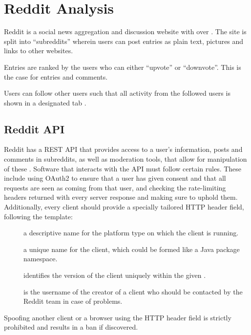 \section{Reddit Analysis}\label{sec:reddit-analysis}
Reddit is a social news aggregation and discussion website with over 
\citep{AdvertiseOnReddit}.
The site is split into ``subreddits'' wherein users can post entries as plain text, pictures and links to other websites. \nl

Entries are ranked by the users who can either ``upvote'' or ``downvote''. This
is the case for entries and comments. \citep{AboutReddit}\nl

Users can follow other users such that all activity from the followed users is
shown in a designated tab .

\subsection{Reddit API}\label{subsec:reddit-api}

Reddit has a \ac{REST} \ac{API} that provides access to a user's information,
posts and comments in subreddits, as well as moderation tools, that allow for
manipulation of these \citep{RedditApi}. Software that interacts with the
\ac{API} must follow certain rules. These include using OAuth2 to ensure that a
user has given consent and that all requests are seen as coming from that user,
and checking the rate-limiting headers returned with every server response and
making sure to uphold them.
Additionally, every client should provide a specially tailored 
\ac{HTTP} header field, following the template: \citep{RedditApiRules}\nl

\begin{center}
\end{center}\nl
\begin{description}
  \item[] a descriptive name for the platform type on which the client is running.
  \item[] a unique name for the client, which could be formed like a Java package namespace.
  \item[] identifies the version of the client uniquely
  within the given .
  \item[] is the username of the creator of a client who
  should be contacted by the Reddit team in case of problems.
\end{description}\nl

Spoofing another client or a browser using the  \ac{HTTP} header field is strictly prohibited and
results in a ban if discovered. \citep{RedditApiRules}\nl